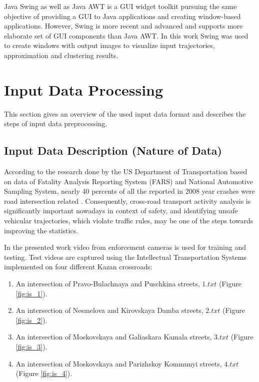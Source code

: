 Java Swing as well as Java AWT is a GUI widget toolkit pursuing the same objective of providing a GUI to Java applications and creating window-based applications. However, Swing is more recent and advanced and supports more elaborate set of GUI components than Java AWT. In this work Swing was used to create windows with output images to visualize input trajectories, approximation and clustering results.

\section{Input Data Processing}

This section gives an overview of the used input data format and describes the steps of input data preprocessing.

\subsection{Input Data Description (Nature of Data)}

According to the research done by the US Department of Transportation based on data of Fatality Analysis Reporting System (FARS) and National Automotive Sampling System, nearly 40 percents of all the reported in 2008 year crashes were road intersection related \cite{inproceedings:10_cfi}. Consequently, cross-road transport activity analysis is significantly important nowadays in context of safety, and identifying unsafe vehicular trajectories, which violate traffic rules, may be one of the steps towards improving the statistics.

In the presented work video from enforcement cameras is used for training and testing. Test videos are captured using the Intellectual Transportation Systems implemented on four different Kazan crossroads:

\begin{enumerate}
	\setlength\itemsep{0em}	
	\item An intersection of Pravo-Bulachnaya and Puschkina streets, $1.txt$ (Figure \ref{fig:is_1}).
	\item An intersection of Nesmelova and Kirovskaya Damba streets, $2.txt$ (Figure \ref{fig:is_2}).
	\item An intersection of Moskovskaya and Galiaskara Kamala streets, $3.txt$ (Figure \ref{fig:is_3}).
	\item An intersection of Moskovskaya and Parizhskoy Kommunyi streets, $4.txt$ (Figure \ref{fig:is_4}).
\end{enumerate}

